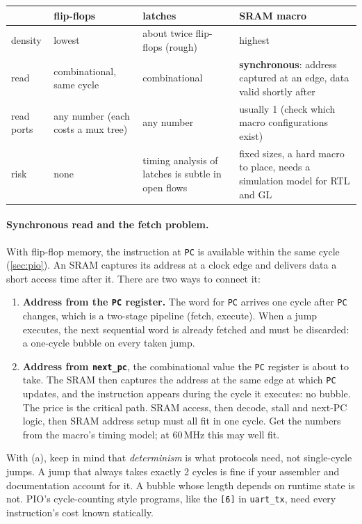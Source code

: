 \begin{center}
\begin{tabular}{|p{2.4cm}|p{3.6cm}|p{3.6cm}|p{3.8cm}|}
\hline
& flip-flops & latches & SRAM macro \\ \hline
density & lowest & about twice flip-flops (rough) & highest \\
read & combinational, same cycle & combinational & \textbf{synchronous}:
  address captured at an edge, data valid shortly after \\
read ports & any number (each costs a mux tree) & any number & usually 1
  (check which macro configurations exist) \\
risk & none & timing analysis of latches is subtle in open flows & fixed
  sizes, a hard macro to place, needs a simulation model for RTL and GL \\
\hline
\end{tabular}
\end{center}

\paragraph{Synchronous read and the fetch problem.} With flip-flop memory,
the instruction at \texttt{PC} is available within the same cycle
(\cref{sec:pio}). An SRAM captures its address at a clock edge and delivers
data a short access time after it. There are two ways to connect it:
\begin{enumerate}[label=(\alph*)]
  \item \textbf{Address from the \texttt{PC} register.} The word for
    \texttt{PC} arrives one cycle after \texttt{PC} changes, which is a
    two-stage pipeline (fetch, execute). When a jump executes, the next
    sequential word is already fetched and must be discarded: a one-cycle
    bubble on every taken jump.
  \item \textbf{Address from \texttt{next\_pc}}, the combinational value the
    \texttt{PC} register is about to take. The SRAM then captures the
    address at the same edge at which \texttt{PC} updates, and the
    instruction appears during the cycle it executes: no bubble. The price
    is the critical path. SRAM access, then decode, stall and next-PC
    logic, then SRAM address setup must all fit in one cycle. Get the
    numbers from the macro's timing model; at 60\,MHz this may well fit.
\end{enumerate}
With (a), keep in mind that \emph{determinism} is what protocols need, not
single-cycle jumps. A jump that always takes exactly 2 cycles is fine if your
assembler and documentation account for it. A bubble whose length depends
on runtime state is not. PIO's cycle-counting style programs, like the
\texttt{[6]} in \texttt{uart\_tx}, need every instruction's cost known
statically.

